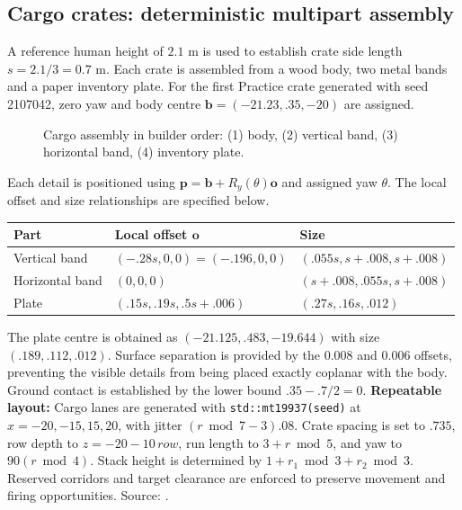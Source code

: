 \subsection{Cargo crates: deterministic multipart assembly}
A reference human height of $2.1$ m is used to establish crate side length $s=2.1/3=0.7$ m. Each crate is assembled from a wood body, two metal bands and a paper inventory plate. For the first Practice crate generated with seed 2107042, zero yaw and body centre $\mathbf b=(-21.23,.35,-20)$ are assigned.
\begin{figure}[htbp]

\caption{Cargo assembly in builder order: (1) body, (2) vertical band, (3) horizontal band, (4) inventory plate.}
\end{figure}

Each detail is positioned using $\mathbf p=\mathbf b+R_y(\theta)\mathbf o$ and assigned yaw $\theta$. The local offset and size relationships are specified below.
\begin{center}\begin{tabular}{lll}\toprule
Part & Local offset $\mathbf o$ & Size \\\midrule
Vertical band & $(-.28s,0,0)=(-.196,0,0)$ & $(.055s,s+.008,s+.008)$\\
Horizontal band & $(0,0,0)$ & $(s+.008,.055s,s+.008)$\\
Plate & $(.15s,.19s,.5s+.006)$ & $(.27s,.16s,.012)$\\\bottomrule
\end{tabular}\end{center}
The plate centre is obtained as $(-21.125,.483,-19.644)$ with size $(.189,.112,.012)$. Surface separation is provided by the $0.008$ and $0.006$ offsets, preventing the visible details from being placed exactly coplanar with the body. Ground contact is established by the lower bound $.35-.7/2=0$.
\textbf{Repeatable layout:} Cargo lanes are generated with \texttt{std::mt19937(seed)} at $x=-20,-15,15,20$, with jitter $(r\bmod7-3).08$. Crate spacing is set to $.735$, row depth to $z=-20-10\,row$, run length to $3+r\bmod5$, and yaw to $90(r\bmod4)$. Stack height is determined by $1+r_1\bmod3+r_2\bmod3$. Reserved corridors and target clearance are enforced to preserve movement and firing opportunities. Source: .
